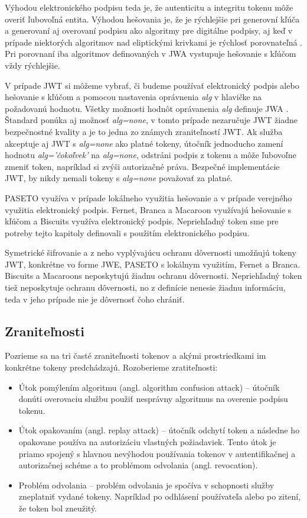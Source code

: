 Výhodou elektronického podpisu teda je, že autenticitu a integritu tokenu môže overiť ľubovoľná entita. Výhodou hešovania je, že je rýchlejšie pri generovní kľúča a generovaní aj overovaní podpisu ako algoritmy pre digitálne podpisy, aj keď v prípade niektorých algoritmov nad eliptickými krivkami je rýchlosť porovnateľná \cite{hmac_perf}. Pri porovnaní iba algoritmov definovaných v JWA \cite{hmac_jwt_perf} vystupuje hešovanie s kľúčom vždy rýchlejšie.

V prípade JWT si môžeme vybrať, či budeme používať elektronický podpis alebo hešovanie s kľúčom a pomocou nastavenia oprávnenia \textit{alg} v hlavičke na požadovanú hodnotu. Všetky možnosti hodnôt oprávanenia \textit{alg} definuje  JWA \cite{jwa_rfc}. Štandard ponúka aj možnosť \textit{alg=none}, v tomto prípade nezaručuje JWT žiadne bezpečnostné kvality a je to jedna zo známych zraniteľností \cite{jwt_vul} JWT. Ak služba akceptuje aj JWT s \textit{alg=none} ako platné tokeny, útočník jednoducho zamení hodnotu \textit{alg='čokoľvek'} na \textit{alg=none}, odstráni podpis z tokenu a môže ľubovoľne zmeniť token, napríklad si zvýši autorizačné práva. Bezpečné implementácie JWT, by nikdy nemali tokeny s \textit{alg=none} považovať za platné.

PASETO využíva v prípade lokálneho využitia hešovanie a v prípade verejného využitia elektronický podpis. Fernet, Branca a Macaroon využívajú hešovanie s kľúčom a Biscuits využíva elektronický podpis. Nepriehľadný token sme pre potreby tejto kapitoly definovali s použitím elektronického podpisu.

Symetrické šifrovanie a z neho vyplývajúcu ochranu dôvernosti umožňujú tokeny JWT, konkrétne vo forme JWE, PASETO s lokálnym využitím, Fernet a Branca. Biscuits a Macaroons neposkytujú žiadnu ochranu dôvernosti. Nepriehľadný token tiež neposkytuje ochranu dôvernosti, no z definície nenesie žiadnu informáciu, teda v jeho prípade nie je dôvernosť čoho chrániť.

\subsection{Zraniteľnosti}

Pozrieme sa na tri časté zraniteľnosti tokenov a akými prostriedkami im konkrétne tokeny predchádzajú. Rozoberieme zratiteľnosti:

\begin{itemize}
    \item Útok pomýlením algoritmu (angl. algorithm confusion attack) -- útočník donúti overovaciu službu použiť nesprávny algoritmus na overenie podpisu tokenu. 
    \item Útok opakovaním (angl. replay attack) -- útočník odchytí token a následne ho opakovane používa na autorizáciu vlastných požiadaviek. Tento útok je priamo spojený s hlavnou nevýhodou používania tokenov v autentifikačnej a autorizačnej schéme a to problémom odvolania (angl. revocation).
    \item Problém odvolania -- problém odvolania je spočíva v schopnosti služby zneplatniť vydané tokeny. Napríklad po odhlásení používateľa alebo po zitení, že token bol zneužitý.
\end{itemize}

